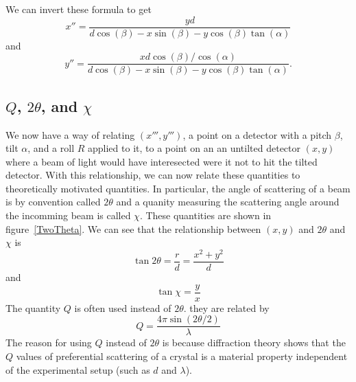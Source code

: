 We can invert these formula to get
\begin{equation}\label{ConvertToPrimed}
    x''=\frac{yd}{d\cos(\beta) - 
    x\sin(\beta)-y\cos(\beta)\tan(\alpha)} 
\end{equation}
and
\begin{equation}
    y''=\frac{xd \cos(\beta)/\cos(\alpha)}{d\cos(\beta) - 
    x\sin(\beta)-y\cos(\beta)\tan(\alpha)}.
\end{equation}

\subsection{$Q$, $2\theta$, and $\chi$}

\begin{SCfigure}
\centering

\caption{For a particular point $(x,y)$, we
alwasy associate two quantities: $2\theta$ and $\chi$.
$2\theta$ is the angle of scattering 
of the beam, or the angle that an incomming beam is 
difflected by when it diffracts off the crystal. 
$\chi$ is a measure of the azimuthal angle around 
the beam. It tells you in what direction radially 
outwards (with respect to the undeflected beam) 
the outgoing beam was was scattered.}
\label{TwoTheta}
\end{SCfigure}

We now have a way of relating $(x''',y''')$, 
a point on a detector with a pitch $\beta$, 
tilt $\alpha$, and a roll $R$ applied to it, 
to a point on an an untilted detector $(x,y)$
where a beam of light would have interesected
were it not to hit the tilted detector.
With this relationship, we can now relate
these quantities to theoretically motivated 
quantities. In particular, the angle of scattering 
of a beam is by convention called $2\theta$ and a 
quanity measuring the scattering angle around the 
incomming beam is called $\chi$. These quantities 
are shown in figure~\ref{TwoTheta}. We can see that 
the relationship between $(x,y)$ and $2\theta$ and 
$\chi$ is
\begin{equation}
    \tan2\theta = \frac{r}{d} = \frac{x^2+y^2}{d}
\end{equation}
and
\begin{equation}
    \tan\chi = \frac{y}{x}
\end{equation}
The quantity $Q$ is often used instead of $2\theta$. 
they are related by
\begin{equation}
    Q = \frac{4\pi \sin(2\theta/2)}{\lambda}
\end{equation}
The reason for using $Q$ instead of $2\theta$ is because 
diffraction theory shows that the $Q$ values of preferential 
scattering of a crystal is a material property independent 
of the experimental setup (such as $d$ and $\lambda$). 

